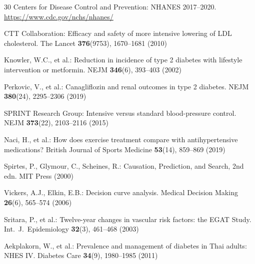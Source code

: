 \documentclass[runningheads]{llncs}
\begin{document}
\begin{thebibliography}{30}
Centers for Disease Control and Prevention:
NHANES 2017--2020.
\url{https://www.cdc.gov/nchs/nhanes/}

CTT Collaboration:
Efficacy and safety of more intensive lowering of LDL cholesterol.
The Lancet \textbf{376}(9753), 1670--1681 (2010)

Knowler, W.C., et al.:
Reduction in incidence of type 2 diabetes with lifestyle intervention or metformin.
NEJM \textbf{346}(6), 393--403 (2002)

Perkovic, V., et al.:
Canagliflozin and renal outcomes in type 2 diabetes.
NEJM \textbf{380}(24), 2295--2306 (2019)

SPRINT Research Group:
Intensive versus standard blood-pressure control.
NEJM \textbf{373}(22), 2103--2116 (2015)

Naci, H., et al.:
How does exercise treatment compare with antihypertensive medications?
British Journal of Sports Medicine \textbf{53}(14), 859--869 (2019)

Spirtes, P., Glymour, C., Scheines, R.:
Causation, Prediction, and Search, 2nd edn.
MIT Press (2000)

Vickers, A.J., Elkin, E.B.:
Decision curve analysis.
Medical Decision Making \textbf{26}(6), 565--574 (2006)

Sritara, P., et al.:
Twelve-year changes in vascular risk factors: the EGAT Study.
Int.\ J.\ Epidemiology \textbf{32}(3), 461--468 (2003)

Aekplakorn, W., et al.:
Prevalence and management of diabetes in Thai adults: NHES IV.
Diabetes Care \textbf{34}(9), 1980--1985 (2011)

\end{thebibliography}
\end{document}
